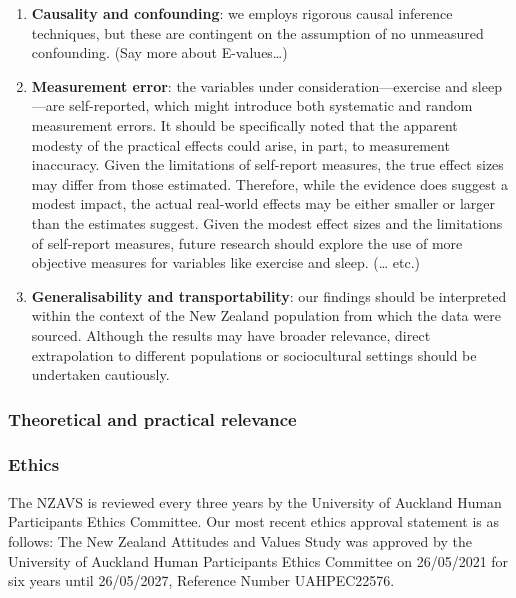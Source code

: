 \documentclass[
  singlecolumn]{article}
\begin{document}
\begin{enumerate}
\def\labelenumi{\arabic{enumi}.}
\item
  \textbf{Causality and confounding}: we employs rigorous causal
  inference techniques, but these are contingent on the assumption of no
  unmeasured confounding. (Say more about E-values\ldots)
\item
  \textbf{Measurement error}: the variables under
  consideration---exercise and sleep---are self-reported, which might
  introduce both systematic and random measurement errors. It should be
  specifically noted that the apparent modesty of the practical effects
  could arise, in part, to measurement inaccuracy. Given the limitations
  of self-report measures, the true effect sizes may differ from those
  estimated. Therefore, while the evidence does suggest a modest impact,
  the actual real-world effects may be either smaller or larger than the
  estimates suggest. Given the modest effect sizes and the limitations
  of self-report measures, future research should explore the use of
  more objective measures for variables like exercise and sleep.
  (\ldots{} etc.)
\item
  \textbf{Generalisability and transportability}: our findings should be
  interpreted within the context of the New Zealand population from
  which the data were sourced. Although the results may have broader
  relevance, direct extrapolation to different populations or
  sociocultural settings should be undertaken cautiously.
\end{enumerate}

\subsubsection{Theoretical and practical
relevance}\label{theoretical-and-practical-relevance}

\newpage{}

\subsubsection{Ethics}\label{ethics}

The NZAVS is reviewed every three years by the University of Auckland
Human Participants Ethics Committee. Our most recent ethics approval
statement is as follows: The New Zealand Attitudes and Values Study was
approved by the University of Auckland Human Participants Ethics
Committee on 26/05/2021 for six years until 26/05/2027, Reference Number
UAHPEC22576.
\end{document}
